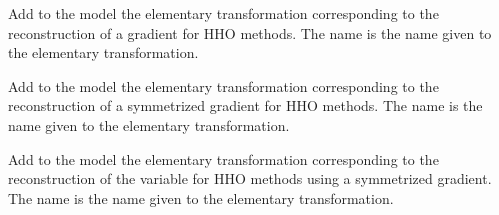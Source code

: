 \documentclass[a4paper,11pt,english]{sphinxmanual}
\begin{document}
\begin{fulllineitems}
\begin{fulllineitems}
\end{fulllineitems}


\begin{fulllineitems}
\label{\detokenize{python/cmdref_Model:getfem.Model.add_HHO_reconstructed_gradient}}
Add to the model the elementary transformation corresponding to the
reconstruction of a gradient for HHO methods.
The name is the name given to the elementary transformation.

\end{fulllineitems}


\begin{fulllineitems}
\label{\detokenize{python/cmdref_Model:getfem.Model.add_HHO_reconstructed_symmetrized_gradient}}
Add to the model the elementary transformation corresponding to the
reconstruction of a symmetrized gradient for HHO methods.
The name is the name given to the elementary transformation.

\end{fulllineitems}


\begin{fulllineitems}
\label{\detokenize{python/cmdref_Model:getfem.Model.add_HHO_reconstructed_symmetrized_value}}
Add to the model the elementary transformation corresponding to the
reconstruction of the variable for HHO methods using a symmetrized
gradient.
The name is the name given to the elementary transformation.

\end{fulllineitems}



\end{fulllineitems}
\end{document}
